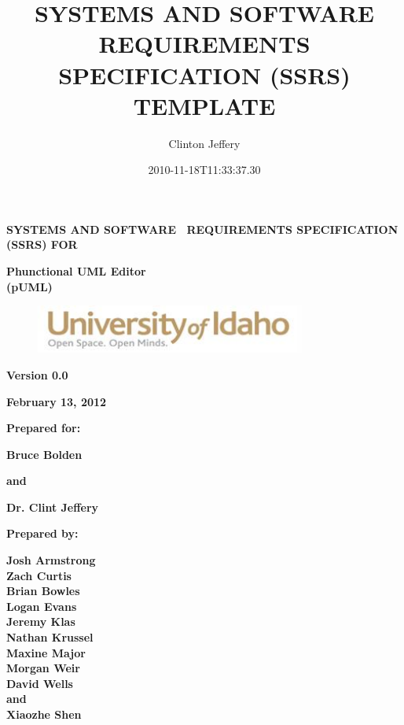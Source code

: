 \documentclass[twoside,letterpaper]{article}
\title{SYSTEMS AND SOFTWARE REQUIREMENTS SPECIFICATION (SSRS) TEMPLATE}
\author{Clinton Jeffery}
\date{2010-11-18T11:33:37.30}
\begin{document}
\clearpage
{\centering\bfseries
SYSTEMS AND SOFTWARE \ REQUIREMENTS SPECIFICATION (SSRS) FOR
\par}


\bigskip

{\centering\bfseries
Phunctional UML Editor
\\(pUML)
\par}


\bigskip


\bigskip


\bigskip

\begin{figure}
\centering
\includegraphics[width=3.5in]{uidahologo.jpg}
\end{figure}

\bigskip


\bigskip

{\centering\bfseries
Version 0.0
\par}

{\centering\bfseries
February 13, 2012
\par}


\bigskip


\bigskip

{\centering\bfseries
Prepared for:
\par}
{\centering\bfseries
Bruce Bolden
\par}
{\centering\bfseries
and
\par}
{\centering\bfseries
Dr. Clint Jeffery
\par}

\bigskip


\bigskip

{\centering\bfseries
Prepared by:
\par}

{\centering\bfseries
Josh Armstrong
\\Zach Curtis
\\Brian Bowles
\\Logan Evans
\\Jeremy Klas
\\Nathan Krussel
\\Maxine Major
\\Morgan Weir
\\David Wells
\\and
\\Xiaozhe Shen
\par}
\end{document}
